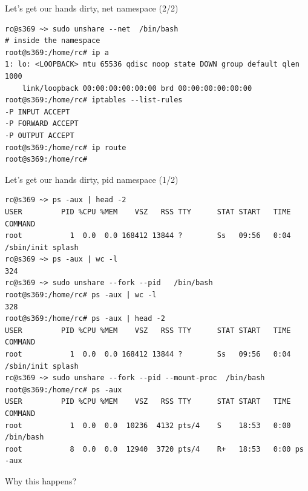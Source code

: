 \documentclass[
  english,          
  aspectratio=169,    %
]{tumbeamer}
\begin{document}
\begin{frame}[fragile]{Let's get our hands dirty, net namespace (2/2)}
\begin{verbatim}
rc@s369 ~> sudo unshare --net  /bin/bash
# inside the namespace
root@s369:/home/rc# ip a
1: lo: <LOOPBACK> mtu 65536 qdisc noop state DOWN group default qlen 1000
    link/loopback 00:00:00:00:00:00 brd 00:00:00:00:00:00
root@s369:/home/rc# iptables --list-rules
-P INPUT ACCEPT
-P FORWARD ACCEPT
-P OUTPUT ACCEPT
root@s369:/home/rc# ip route
root@s369:/home/rc# 
\end{verbatim}
\end{frame}

\begin{frame}[fragile]{Let's get our hands dirty, pid namespace (1/2)}
\begin{verbatim}
rc@s369 ~> ps -aux | head -2
USER         PID %CPU %MEM    VSZ   RSS TTY      STAT START   TIME COMMAND
root           1  0.0  0.0 168412 13844 ?        Ss   09:56   0:04 /sbin/init splash
rc@s369 ~> ps -aux | wc -l
324
rc@s369 ~> sudo unshare --fork --pid   /bin/bash
root@s369:/home/rc# ps -aux | wc -l
328
root@s369:/home/rc# ps -aux | head -2
USER         PID %CPU %MEM    VSZ   RSS TTY      STAT START   TIME COMMAND
root           1  0.0  0.0 168412 13844 ?        Ss   09:56   0:04 /sbin/init splash
rc@s369 ~> sudo unshare --fork --pid --mount-proc  /bin/bash
root@s369:/home/rc# ps -aux
USER         PID %CPU %MEM    VSZ   RSS TTY      STAT START   TIME COMMAND
root           1  0.0  0.0  10236  4132 pts/4    S    18:53   0:00 /bin/bash
root           8  0.0  0.0  12940  3720 pts/4    R+   18:53   0:00 ps -aux
\end{verbatim}
Why this happens? 
\end{frame}
\end{document}
